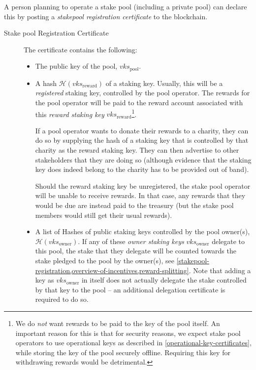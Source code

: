 \documentclass[11pt,a4paper]{article}
\begin{document}
A person planning to operate a stake pool (including a private pool) can
declare this by posting a \emph{stakepool registration certificate} to
the blockchain.

\begin{description}
\item[Stake pool Registration Certificate]
The certificate contains the following:

\begin{itemize}
\item
  The public key of the pool, \(vks_\text{pool}\).

\item
  A hash \(\mathcal{H}(vks_\text{reward})\) of a staking key. Usually, this will
  be a \emph{registered} staking key, controlled by the pool operator. The
  rewards for the pool operator will be paid to the reward account associated
  with this \emph{reward staking key} \(vks_\text{reward}\)\footnote{We do
    \emph{not} want rewards to be paid to the key of the pool itself. An
    important reason for this is that for security reasons, we expect stake pool
    operators to use operational keys as described in
    \cref{operational-key-certificates}, while storing the key of the pool
    securely offline. Requiring this key for withdrawing rewards would be
    detrimental.}.

  If a pool operator wants to donate their rewards to a charity, they can do so
  by supplying the hash of a staking key that is controlled by that charity as
  the reward staking key. They can then advertise to other stakeholders that
  they are doing so (although evidence that the staking key does indeed belong
  to the charity has to be provided out of band).

  Should the reward staking key be unregistered, the stake pool operator will be
  unable to receive rewards. In that case, any rewards that they would be due
  are instead paid to the treasury (but the stake pool members would still get
  their usual rewards).

\item A list of Hashes of public staking keys controlled by the pool owner(s),
  \(\mathcal{H}(vks_\text{owner})\). If any of these \emph{owner staking keys}
  \(vks_\text{owner}\) delegate to this pool, the stake that they delegate will
  be counted towards the stake pledged to the pool by the owner(s), see
  \cref{stakepool-registration,overview-of-incentives,reward-splitting}. Note
  that adding a key as \(vks_\text{owner}\) in itself does not actually delegate
  the stake controlled by that key to the pool -- an additional delegation
  certificate is required to do so.


\end{itemize}
\end{description}
\end{document}
